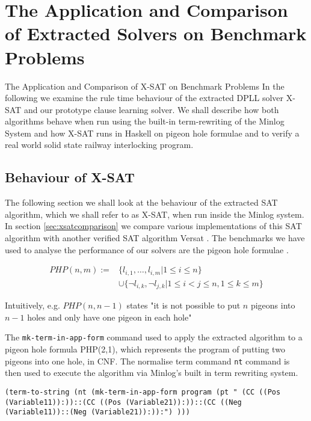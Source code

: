 \chapter{The Application and Comparison of Extracted Solvers on Benchmark Problems}{The Application and Comparison of X-SAT on Benchmark Problems} \label{chapter:dpllapp}
In the following we examine the rule time behaviour of the extracted DPLL solver X-SAT and our prototype clause learning solver. We shall describe how both algorithms behave when run using the built-in term-rewriting of the Minlog System and how X-SAT runs in Haskell on pigeon hole formulae and to verify a real world solid state railway interlocking program.



\section{Behaviour of X-SAT}
The following section we shall look at the behaviour of the extracted SAT algorithm, which we shall refer to as X-SAT, when run inside the Minlog system. In section \ref{sec:xsatcomparison} we compare various implementations of this SAT algorithm with another verified SAT algorithm Versat \cite{DO12}.  The benchmarks we have used to analyse the performance of our solvers are the pigeon hole formulae \cite{SC79}. \\
\medskip
\begin{mydef}
\begin{align*}
PHP(n,m) := &\{l_{i,1} , \ldots , l_{i,m} | 1 \leq i \leq n  \}  \\
  & \cup \{ \neg l_{i,k} , \neg l_{j,k} | 1 \leq i < j \leq n, 1 \leq k \leq m \} 
\end{align*}

\end{mydef}


Intuitively, e.g. $PHP(n,n-1)$ states "it is not possible to put $n$ pigeons into $n-1$ holes and only have one pigeon in each hole"

The \texttt{mk-term-in-app-form} command used to apply the extracted algorithm to a pigeon hole formula PHP(2,1), which represents the program of putting two pigeons into one hole, in CNF. The normalise term command \texttt{nt} command is then used to execute the algorithm via Minlog's built in term rewriting system.

\begin{center}
\texttt{(term-to-string (nt (mk-term-in-app-form program (pt " (CC ((Pos (Variable11)):))::(CC ((Pos (Variable21)):))::(CC ((Neg (Variable11))::(Neg (Variable21)):)):") )))}
\end{center}

